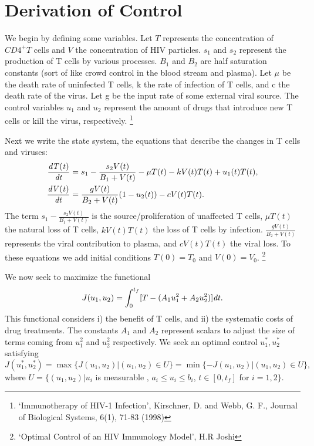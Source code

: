 %

\section*{Derivation of Control}
We begin by defining some variables.
Let $T$ represents the concentration of $CD4^+T$ cells and $V$ the concentration of HIV particles.
$s_1$ and $s_2$ represent the production of T cells by various processes.
$B_1$ and $B_2$ are half saturation constants (sort of like crowd control in the blood stream and plasma).
Let $\mu$ be the death rate of uninfected T cells, k the rate of infection of T cells, and c the death rate of the virus.
Let g be the input rate of some external viral source.
The control variables $u_1$ and $u_2$ represent the amount of drugs that introduce new T cells or kill the virus, respectively.
\footnote{`Immunotherapy of HIV-1 Infection', Kirschner, D. and Webb, G. F., Journal of Biological Systems, 6(1), 71-83 (1998)}

Next we write the state system, the equations that describe the changes in T cells and viruses:
\begin{align}
	\begin{split}
		\frac{\it{d}T(t)}{\it{dt}} &= s_1 - \frac{s_2V(t)}{B_1+V(t)} - \mu T(t)-kV(t)T(t)+u_1(t)T(t), \\
		\frac{\it{d}V(t)}{\it{dt}} &= \frac{gV(t)}{B_2+V(t)}(1-u_2(t)) - cV(t)T(t).
	\end{split} \label{original_state:HIV}
\end{align}
The term $s_1-\frac{s_2V(t)}{B_1+V(t)}$ is the source/proliferation of unaffected T cells,
$\mu T(t)$ the natural loss of T cells, $kV(t)T(t)$ the loss of T cells by infection. 
$\frac{gV(t)}{B_2+V(t)}$ represents the viral contribution to plasma, and $cV(t)T(t)$ the viral loss.
To these equations we add initial conditions $T(0)=T_0$ and $V(0)=V_0$.
\footnote{`Optimal Control of an HIV Immunology Model', H.R Joshi}

We now seek to maximize the functional 
\[
J(u_1,u_2) = \int_0^{t_f}[T-(A_1u_1^2+A_2u_2^2)]\it{dt}.
\]
This functional considers i) the benefit of T cells, and ii) the systematic costs of drug treatments.
The constants $A_1$ and $A_2$ represent scalars to adjust the size of terms coming from $u_1^2$ and $u_2^2$ respectively. 
We seek an optimal control $u_1^*,u_2^*$ satisfying
\[
J(u_1^*,u_2^*)=\max\{J(u_1,u_2)|(u_1,u_2)\in U\}=\min\{-J(u_1,u_2)|(u_1,u_2)\in U\},
\]
where $U=\{(u_1,u_2)|u_i $ is measurable $,\,a_i\le u_i \le b_i$, $t\in[0,t_f]$ for $i=1,2\}$.
 
